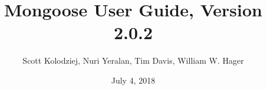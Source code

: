 \title{Mongoose User Guide, Version 2.0.2}
\author{Scott Kolodziej, Nuri Yeralan, Tim Davis, William W. Hager}
\date{July 4, 2018}
